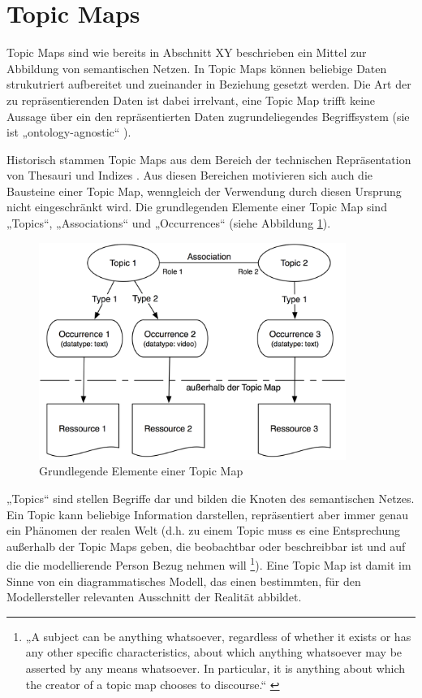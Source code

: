 
\section{Topic Maps} %
\label{sec:topic_maps}

Topic Maps \citep{TMDM08} sind wie bereits in Abschnitt XY beschrieben ein Mittel zur Abbildung von semantischen Netzen. In Topic Maps können beliebige Daten strukutriert aufbereitet und zueinander in Beziehung gesetzt werden. Die Art der zu repräsentierenden Daten ist dabei irrelvant, eine Topic Map trifft keine Aussage über ein den repräsentierten Daten zugrundeliegendes Begriffsystem (sie ist „ontology-agnostic“ \citep{Vatant04}).

Historisch stammen Topic Maps aus dem Bereich der technischen Repräsentation von Thesauri und Indizes \citep{Pepper00} \citep{Rath03}. Aus diesen Bereichen motivieren sich auch die Bausteine einer Topic Map, wenngleich der Verwendung durch diesen Ursprung nicht eingeschränkt wird. Die grundlegenden Elemente einer Topic Map sind „Topics“, „Associations“ und „Occurrences“ (siehe Abbildung \ref{fig:img_Persistenz_TMBasic}). 

\begin{figure}[htbp]
	\centering
		\includegraphics[width=10cm]{img/Persistenz/TMBasic.png}
	\caption{Grundlegende Elemente einer Topic Map}
	\label{fig:img_Persistenz_TMBasic}
\end{figure}

„Topics“ sind stellen Begriffe dar und bilden die Knoten des semantischen Netzes. Ein Topic kann beliebige Information darstellen, repräsentiert aber immer genau ein Phänomen der realen Welt (d.h. zu einem Topic muss es eine Entsprechung außerhalb der Topic Maps geben, die beobachtbar oder beschreibbar ist und auf die die modellierende Person Bezug nehmen will \footnote{„A subject can be anything whatsoever, regardless of whether it exists or has any other specific characteristics, about which anything whatsoever may be asserted by any means whatsoever. In particular, it is anything about which the creator of a topic map chooses to discourse.“ \citep[][S.8]{TMDM08}}). Eine Topic Map ist damit im Sinne von \citet{Stachowiak73} ein diagrammatisches Modell, das einen bestimmten, für den Modellersteller relevanten Ausschnitt der Realität abbildet.

